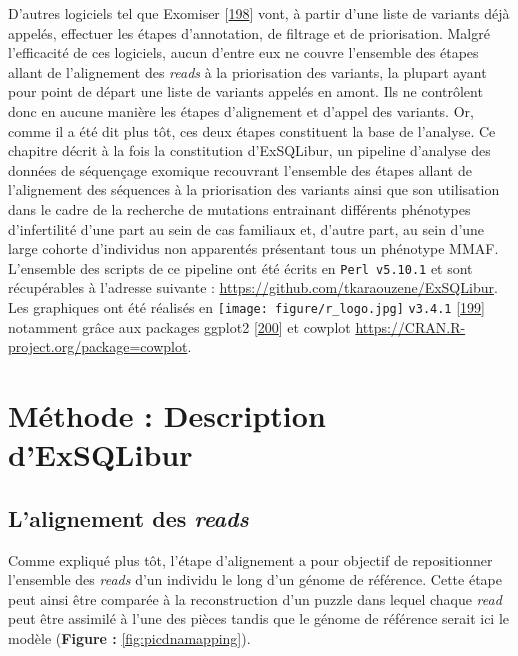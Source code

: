 \documentclass[12pt,a4paper,twoside]{ugathesis}
\theoremstyle{definition}
\theoremstyle{definition}
\theoremstyle{definition}
\theoremstyle{remark}
\begin{document}
D'autres logiciels tel que Exomiser
{[}\protect\hyperlink{ref-Robinson2014}{198}{]} vont, à partir d'une
liste de variants déjà appelés, effectuer les étapes d'annotation, de
filtrage et de priorisation. Malgré l'efficacité de ces logiciels, aucun
d'entre eux ne couvre l'ensemble des étapes allant de l'alignement des
\emph{reads} à la priorisation des variants, la plupart ayant pour point
de départ une liste de variants appelés en amont. Ils ne contrôlent donc
en aucune manière les étapes d'alignement et d'appel des variants. Or,
comme il a été dit plus tôt, ces deux étapes constituent la base de
l'analyse. Ce chapitre décrit à la fois la constitution d'ExSQLibur, un
pipeline d'analyse des données de séquençage exomique recouvrant
l'ensemble des étapes allant de l'alignement des séquences à la
priorisation des variants ainsi que son utilisation dans le cadre de la
recherche de mutations entrainant différents phénotypes d'infertilité
d'une part au sein de cas familiaux et, d'autre part, au sein d'une
large cohorte d'individus non apparentés présentant tous un phénotype
MMAF. L'ensemble des scripts de ce pipeline ont été écrits en
\texttt{Perl\ v5.10.1} et sont récupérables à l'adresse suivante :
\url{https://github.com/tkaraouzene/ExSQLibur}. Les graphiques ont été
réalisés en \texttt{[image: figure/r\_logo.jpg]}
\texttt{v3.4.1} {[}\protect\hyperlink{ref-RCoreTeam2017}{199}{]}
notamment grâce aux packages ggplot2
{[}\protect\hyperlink{ref-Wickham2009}{200}{]} et cowplot
\url{https://CRAN.R-project.org/package=cowplot}.

\newpage

\section{Méthode : Description
d'ExSQLibur}\label{methode-description-dexsqlibur}

\subsection{\texorpdfstring{L'alignement des
\emph{reads}}{L'alignement des reads}}\label{lalignement-des-reads}

Comme expliqué plus tôt, l'étape d'alignement a pour objectif de
repositionner l'ensemble des \emph{reads} d'un individu le long d'un
génome de référence. Cette étape peut ainsi être comparée à la
reconstruction d'un puzzle dans lequel chaque \emph{read} peut être
assimilé à l'une des pièces tandis que le génome de référence serait ici
le modèle (\textbf{Figure : }\ref{fig:picdnamapping}).
\end{document}
